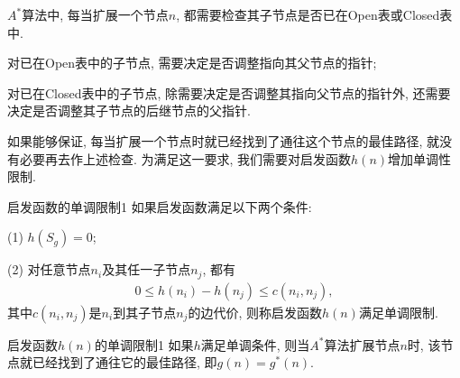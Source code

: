 \begin{remark}
    $A^*$算法中, 每当扩展一个节点$n$, 都需要检查其子节点是否已在Open表或Closed表中.
\end{remark}

 对已在Open表中的子节点, 需要决定是否调整指向其父节点的指针;

 对已在Closed表中的子节点, 除需要决定是否调整其指向父节点的指针外, 还需要决定是否调整其子节点的后继节点的父指针.

如果能够保证, 每当扩展一个节点时就已经找到了通往这个节点的最佳路径, 就没有必要再去作上述检查.
为满足这一要求, 我们需要对启发函数$h(n)$增加单调性限制.
\begin{mydef}{启发函数的单调限制}{1}
如果启发函数满足以下两个条件:

(1) $h(S_g)=0$;

(2) 对任意节点$n_i$及其任一子节点$n_j$, 都有
\begin{align}
    0\leq h(n_i)-h(n_j)\leq c(n_i, n_j),
\end{align}
其中$c(n_i, n_j)$是$n_i$到其子节点$n_j$的边代价, 则称启发函数$h(n)$满足单调限制. 
\end{mydef}
\begin{mythm}{启发函数$h(n)$的单调限制}{1}
    如果$h$满足单调条件, 则当$A^*$算法扩展节点$n$时, 该节点就已经找到了通往它的最佳路径, 即$g(n)=g^*(n)$.
\end{mythm}
